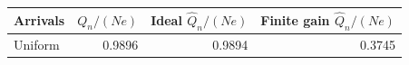 \begin{tabular}{lrrr}
\toprule
Arrivals & $Q_n/(Ne)$ & Ideal $\widehat Q_n/(Ne)$ & Finite gain $\widehat Q_n/(Ne)$ \\
\midrule
Uniform & 0.9896 & 0.9894 & 0.3745 \\
\bottomrule
\end{tabular}
